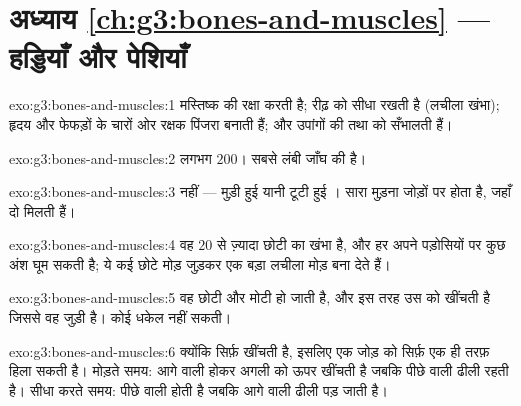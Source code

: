 \section*{अध्याय \ref{ch:g3:bones-and-muscles} --- हड्डियाँ और पेशियाँ}

\begin{solution}{exo:g3:bones-and-muscles:1}
 मस्तिष्क की रक्षा करती है; रीढ़  को सीधा रखती है (लचीला
खंभा);  हृदय और फेफड़ों के चारों ओर रक्षक पिंजरा बनाती हैं;
और उपांगों की   तथा  को सँभालती हैं।
\end{solution}

\begin{solution}{exo:g3:bones-and-muscles:2}
लगभग $200$। सबसे लंबी जाँघ की  है।
\end{solution}

\begin{solution}{exo:g3:bones-and-muscles:3}
नहीं --- मुड़ी हुई  यानी टूटी हुई । सारा मुड़ना जोड़ों पर
होता है, जहाँ दो  मिलती हैं।
\end{solution}

\begin{solution}{exo:g3:bones-and-muscles:4}
वह $20$ से ज़्यादा छोटी  का खंभा है, और हर  अपने पड़ोसियों
पर कुछ अंश घूम सकती है; ये कई छोटे मोड़ जुड़कर एक बड़ा लचीला मोड़ बना
देते हैं।
\end{solution}

\begin{solution}{exo:g3:bones-and-muscles:5}
वह छोटी और मोटी हो जाती है, और इस तरह उस  को खींचती है जिससे वह
जुड़ी है। कोई  धकेल नहीं सकती।
\end{solution}

\begin{solution}{exo:g3:bones-and-muscles:6}
क्योंकि  सिर्फ़ खींचती है, इसलिए एक  जोड़ को सिर्फ़ एक ही तरफ़
हिला सकती है। मोड़ते समय: आगे वाली   होकर अगली  को ऊपर
खींचती है जबकि पीछे वाली ढीली रहती है। सीधा करते समय: पीछे वाली 
 होती है जबकि आगे वाली ढीली पड़ जाती है।
\end{solution}

